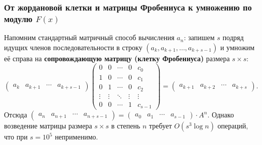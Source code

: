 \subsubsection{От жордановой клетки и матрицы Фробениуса к умножению по модулю \texorpdfstring{$F(x)$}{F(x)}}

Напомним стандартный матричный способ вычисления $a_n$: запишем $s$ подряд идущих членов последовательности в строку $(a_k, a_{k+1}, \dots, a_{k+s-1})$ и умножим её справа на \textbf{сопровождающую матрицу (клетку Фробениуса)} размера $s \times s$:
\[
    \begin{pmatrix} a_k & a_{k+1} & \cdots & a_{k+s-1} \end{pmatrix}
    \begin{pmatrix}
        0 & 0 & \cdots & 0 & c_0 \\
        1 & 0 & \cdots & 0 & c_1 \\
        0 & 1 & \cdots & 0 & c_2 \\
        \vdots & \vdots & \ddots & \vdots & \vdots \\
        0 & 0 & \cdots & 1 & c_{s-1}
    \end{pmatrix}
    = \begin{pmatrix} a_{k+1} & a_{k+2} & \cdots & a_{k+s} \end{pmatrix}.
\]
Отсюда $\begin{pmatrix} a_n & a_{n+1} & \cdots & a_{n+s-1} \end{pmatrix} = \begin{pmatrix} a_0 & a_1 & \cdots & a_{s-1} \end{pmatrix} \cdot A^n$. Однако возведение матрицы размера $s \times s$ в степень $n$ требует $O(s^3 \log n)$ операций, что при $s = 10^5$ неприменимо.

